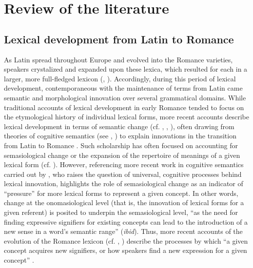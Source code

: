 \documentclass[output=paper,colorlinks,citecolor=brown,
]{langscibook}
\begin{document}
\section{Review of the literature}
\subsection{Lexical development from Latin to Romance}
As Latin spread throughout Europe and evolved into the Romance varieties, speakers crystalized and expanded upon these lexica, which resulted for each in a larger, more full-fledged lexicon (\citealt[287]{alkire_romance_2010}, \citealt[257]{glessgen_linguistique_2007}). Accordingly, during this period of lexical development, contemporaneous with the maintenance of terms from Latin came semantic and morphological innovation over several grammatical domains. While traditional accounts of lexical development in early Romance tended to focus on the etymological history of individual lexical forms, more recent accounts describe lexical development in terms of semantic change (cf. \citealt{posner_romance_1996}, \citealt{glessgen_linguistique_2007}, \citealt{alkire_romance_2010}), often drawing from theories of cognitive semantics (see \citealt{koch_pour_2002}, \citealt{koch_verbe_2002}) to explain innovations in the transition from Latin to Romance \citep{dworkin_recent_2006}. Such scholarship has often focused on accounting for semasiological change \citep[52]{dworkin_recent_2006} or the expansion of the repertoire of meanings of a given lexical form (cf. \citealt{posner_romance_1996}). 
However, referencing more recent work in cognitive semantics carried out by \cite{koch_pour_2002, koch_verbe_2002}, who raises the question of universal, cognitive processes behind lexical innovation, \citet[52]{dworkin_recent_2006} highlights the role of semasiological change as an indicator of “pressure” for more lexical forms to represent a given concept. In other words, change at the onomasiological level (that is, the innovation of lexical forms for a given referent) is posited to underpin the semasiological level, “as the need for finding expressive signifiers for existing concepts can lead to the introduction of a new sense in a word’s semantic range” (\textit{ibid}). Thus, more recent accounts of the evolution of the Romance lexicon (cf. \citealt{alkire_romance_2010}, \citealt{glessgen_linguistique_2007}) describe the processes by which “a given concept acquires new signifiers, or how speakers find a new expression for a given concept” \citep[52]{dworkin_recent_2006}.
\end{document}
